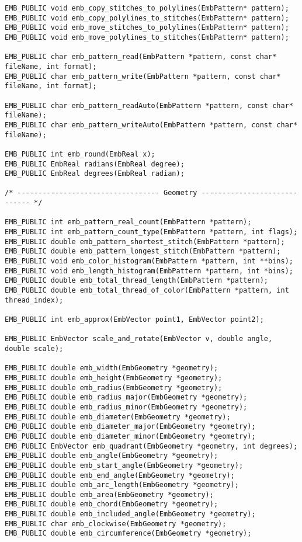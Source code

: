 \begin{verbatim}
EMB_PUBLIC void emb_copy_stitches_to_polylines(EmbPattern* pattern);
EMB_PUBLIC void emb_copy_polylines_to_stitches(EmbPattern* pattern);
EMB_PUBLIC void emb_move_stitches_to_polylines(EmbPattern* pattern);
EMB_PUBLIC void emb_move_polylines_to_stitches(EmbPattern* pattern);

EMB_PUBLIC char emb_pattern_read(EmbPattern *pattern, const char* fileName, int format);
EMB_PUBLIC char emb_pattern_write(EmbPattern *pattern, const char* fileName, int format);

EMB_PUBLIC char emb_pattern_readAuto(EmbPattern *pattern, const char* fileName);
EMB_PUBLIC char emb_pattern_writeAuto(EmbPattern *pattern, const char* fileName);

EMB_PUBLIC int emb_round(EmbReal x);
EMB_PUBLIC EmbReal radians(EmbReal degree);
EMB_PUBLIC EmbReal degrees(EmbReal radian);

/* ---------------------------------- Geometry ----------------------------- */

EMB_PUBLIC int emb_pattern_real_count(EmbPattern *pattern);
EMB_PUBLIC int emb_pattern_count_type(EmbPattern *pattern, int flags);
EMB_PUBLIC double emb_pattern_shortest_stitch(EmbPattern *pattern);
EMB_PUBLIC double emb_pattern_longest_stitch(EmbPattern *pattern);
EMB_PUBLIC void emb_color_histogram(EmbPattern *pattern, int **bins);
EMB_PUBLIC void emb_length_histogram(EmbPattern *pattern, int *bins);
EMB_PUBLIC double emb_total_thread_length(EmbPattern *pattern);
EMB_PUBLIC double emb_total_thread_of_color(EmbPattern *pattern, int thread_index);

EMB_PUBLIC int emb_approx(EmbVector point1, EmbVector point2);

EMB_PUBLIC EmbVector scale_and_rotate(EmbVector v, double angle, double scale);

EMB_PUBLIC double emb_width(EmbGeometry *geometry);
EMB_PUBLIC double emb_height(EmbGeometry *geometry);
EMB_PUBLIC double emb_radius(EmbGeometry *geometry);
EMB_PUBLIC double emb_radius_major(EmbGeometry *geometry);
EMB_PUBLIC double emb_radius_minor(EmbGeometry *geometry);
EMB_PUBLIC double emb_diameter(EmbGeometry *geometry);
EMB_PUBLIC double emb_diameter_major(EmbGeometry *geometry);
EMB_PUBLIC double emb_diameter_minor(EmbGeometry *geometry);
EMB_PUBLIC EmbVector emb_quadrant(EmbGeometry *geometry, int degrees);
EMB_PUBLIC double emb_angle(EmbGeometry *geometry);
EMB_PUBLIC double emb_start_angle(EmbGeometry *geometry);
EMB_PUBLIC double emb_end_angle(EmbGeometry *geometry);
EMB_PUBLIC double emb_arc_length(EmbGeometry *geometry);
EMB_PUBLIC double emb_area(EmbGeometry *geometry);
EMB_PUBLIC double emb_chord(EmbGeometry *geometry);
EMB_PUBLIC double emb_included_angle(EmbGeometry *geometry);
EMB_PUBLIC char emb_clockwise(EmbGeometry *geometry);
EMB_PUBLIC double emb_circumference(EmbGeometry *geometry);


\end{verbatim}
